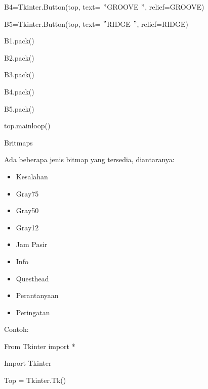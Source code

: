 \documentclass [12pt,a4paper,notitlepage,oneside,bahasa]{article}
\begin{document}
{\fontsize{10pt}{10pt}\selectfont B4=Tkinter.Button(top, text= $ " $GROOVE $ " $, relief=GROOVE)} \par
{\fontsize{10pt}{10pt}\selectfont B5=Tkinter.Button(top, text= $ " $RIDGE $ " $, relief=RIDGE)} \par
\vspace{10pt}
{\fontsize{10pt}{10pt}\selectfont B1.pack()} \par
{\fontsize{10pt}{10pt}\selectfont B2.pack()} \par
{\fontsize{10pt}{10pt}\selectfont B3.pack()} \par
{\fontsize{10pt}{10pt}\selectfont B4.pack()} \par
{\fontsize{10pt}{10pt}\selectfont B5.pack()} \par
{\fontsize{10pt}{10pt}\selectfont top.mainloop()} \par
\noindent 
Britmaps \par
\noindent 
Ada beberapa jenis bitmap yang tersedia, diantaranya: \par
\noindent 
\begin{itemize}
\item Kesalahan \par
\noindent 
\item Gray75 \par
\noindent 
\item Gray50 \par
\noindent 
\item Gray12 \par
\noindent 
\item Jam Pasir \par
\noindent 
\item Info \par
\noindent 
\item Questhead \par
\noindent 
\item Perantanyaan  \par
\noindent 
\item Peringatan\end{itemize}
 \par
\vspace{12pt}
Contoh: \par
{\fontsize{10pt}{10pt}\selectfont From Tkinter import *} \par
{\fontsize{10pt}{10pt}\selectfont Import Tkinter} \par
\vspace{10pt}
{\fontsize{10pt}{10pt}\selectfont Top = Tkinter.Tk()} \par
\end{document}
